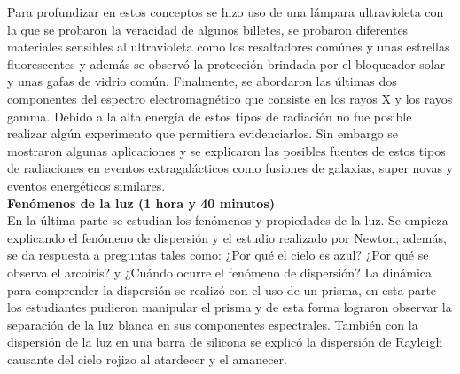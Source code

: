\documentclass[a4paper,10pt]{article}
\begin{document}
\noindent Para profundizar en estos conceptos se hizo uso de una lámpara ultravioleta con la que se probaron la veracidad de algunos billetes, se probaron diferentes materiales sensibles al ultravioleta como los resaltadores comúnes y unas estrellas fluorescentes y además se observó la protección brindada por el bloqueador solar y unas gafas de vidrio común. Finalmente, se abordaron las últimas dos componentes del espectro electromagnético que consiste en los rayos X y los rayos gamma. Debido a la alta energía de estos tipos de radiación no fue posible realizar algún experimento que permitiera evidenciarlos. Sin embargo se mostraron algunas aplicaciones y se explicaron las posibles fuentes de estos tipos de radiaciones en eventos extragalácticos como fusiones de galaxias, super novas y eventos energéticos similares.\\



\noindent \textbf{Fenómenos de la luz (1 hora y 40 minutos)}\\


\noindent En la última parte se estudian los fenómenos y propiedades de la luz. Se empieza explicando el fenómeno de dispersión y el estudio realizado por Newton; además, se da respuesta a preguntas tales como: ¿Por qué el cielo es azul? ¿Por qué se observa el arcoíris? y ¿Cuándo ocurre el fenómeno de dispersión? La dinámica para comprender la dispersión se realizó con el uso de un prisma, en esta parte los estudiantes pudieron manipular el prisma y de esta forma lograron observar la separación de la luz blanca en sus componentes espectrales. También con la dispersión de la luz en una barra de silicona se explicó la dispersión de Rayleigh causante del cielo rojizo al atardecer y el amanecer.\\
\end{document}
